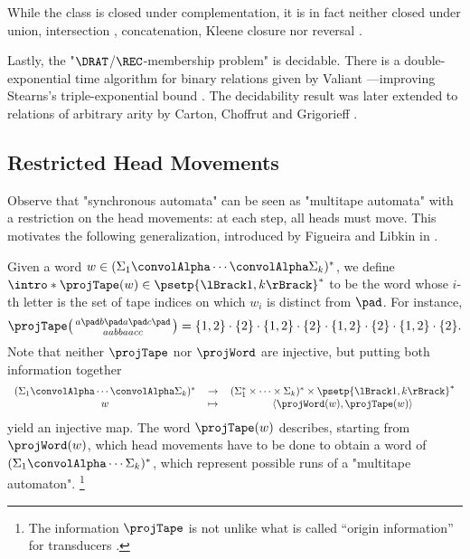 While the class is closed under complementation, it is in fact neither closed under union,
intersection \cite[Theorem~17]{RabinScott1959FiniteAutomata},
concatenation, Kleene closure nor reversal
\cite[Table~1]{FischerRosenberg1968Multitape}.

Lastly, the "$\DRAT$/$\REC$-membership problem" is decidable.
There is a double-exponential time algorithm for binary relations
given by Valiant \cite{Valiant1975RegularityDeterministicPushdown}---improving Stearns's
triple-exponential bound \cite{Stearns1967RegularityPushdown}.
The decidability result was later extended to relations of arbitrary arity by Carton, Choffrut and 
Grigorieff \cite[Theorem 3.7]{CartonChoffrutGrigorieff2006DecisionProblems}.

\subsection{Restricted Head Movements}
\label{sec:preliminaries-automatic-structures-relations-restricted-head-movements}

Observe that "synchronous automata" can be seen as "multitape automata" with
a restriction on the head movements: at each step, all heads must move.
This motivates the following generalization, introduced by Figueira and Libkin in
\cite{FigueiraLibkin2015SynchronizingRelations}.

Given a word $w \in (\Sigma_1 \convolAlpha \cdots \convolAlpha \Sigma_k)^*$,
we define \AP$\intro*\projTape(w) \in \psetp{\lBrack 1,k\rBrack}^*$ to be the word
whose $i$-th letter is the set of tape indices on which $w_i$ is distinct from $\pad$. 
For instance,
\[
	\projTape\pair{a \pad b \pad a \pad c \pad}{a a b b a a c c}
	= \{1,2\} \cdot \{2\} \cdot \{1,2\} \cdot \{2\} \cdot \{1,2\} \cdot \{2\} \cdot \{1,2\} \cdot \{2\}.
\]
Note that neither $\projTape$ nor $\projWord$ are injective, but putting both information together 
\[
	\begin{tabular}{ccc}
		$(\Sigma_1 \convolAlpha \cdots \convolAlpha \Sigma_k)^*$ & $\to$
			& $(\Sigma_1^* \times \cdots \times \Sigma_k)^* \times \psetp{\lBrack 1,k\rBrack}^*$\\
		$w$ & $\mapsto$ & $\tup{\projWord(w), \projTape(w)}$
	\end{tabular}
\]
yield an injective map.
The word $\projTape(w)$ describes, starting from $\projWord(w)$, which 
head movements have to be done to obtain a word of $(\Sigma_1 \convolAlpha \cdots \Sigma_k)^*$, which represent possible runs of a "multitape automaton".%
\footnote{The information $\projTape$ is not unlike what is called
``origin information'' for transducers \cite{Bojanczyk2014TransducersOriginInformation}.}

